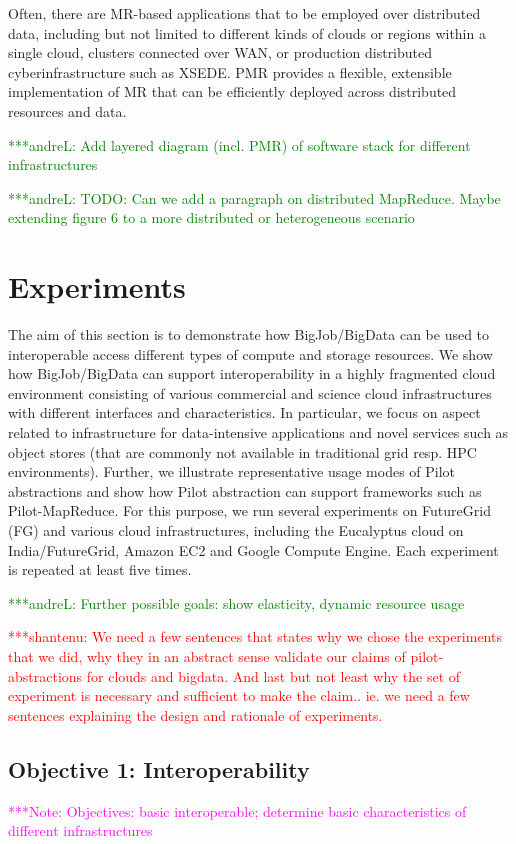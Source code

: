 \documentclass[times]{cpeauth}
\newcommand{\jhanote}[1]{ {\textcolor{red} { ***shantenu: #1 }}}
\newcommand{\alnote}[1]{ {\textcolor{green} { ***andreL: #1 }}}
\newcommand{\note}[1]{ {\textcolor{magenta} { ***Note: #1 }}}
\newcommand{\alnote}[1]{}
\newcommand{\jhanote}[1]{}
\newcommand{\note}[1]{}
\newcommand{\pilot}{Pilot\xspace}
\begin{document}
Often, there are MR-based applications that to be employed over distributed
data, including but not limited to different kinds of clouds or regions within
a single cloud, clusters connected over WAN, or production distributed
cyberinfrastructure such as XSEDE. PMR provides a flexible, extensible 
implementation of MR that can be efficiently deployed across distributed 
resources and data.



\alnote{Add layered diagram (incl. PMR) of software stack for different 
infrastructures}

\alnote{TODO: Can we add a paragraph on distributed MapReduce. Maybe extending 
figure 6 to a more distributed or heterogeneous scenario}


\section{Experiments}

The aim of this section is to demonstrate how BigJob/BigData can be used to
interoperable access different types of compute and storage resources. We show
how BigJob/BigData can support interoperability in a highly fragmented cloud
environment consisting of various commercial and science cloud infrastructures
with different interfaces and characteristics. In particular, we focus on
aspect related to infrastructure for data-intensive applications and novel
services such as object stores (that are commonly not available in traditional
grid resp. HPC environments). Further, we illustrate representative usage
modes of \pilot abstractions and show how \pilot abstraction can support
frameworks such as Pilot-MapReduce. For this purpose, we run several
experiments on FutureGrid (FG) and various cloud infrastructures, including
the Eucalyptus cloud on India/FutureGrid, Amazon EC2 and Google Compute
Engine. Each experiment is repeated at least five times.

\alnote{Further possible goals: show elasticity, dynamic resource usage}

\jhanote{We need a few sentences that states why we chose the
  experiments that we did, why they in an abstract sense validate our
  claims of pilot-abstractions for clouds and bigdata.  And last but
  not least why the set of experiment is necessary and sufficient to
  make the claim..  ie. we need a few sentences explaining the design
  and rationale of experiments.}
	
\subsection{Objective 1: Interoperability}
\label{sec:perf_interop}
\note{Objectives: basic interoperable; determine basic characteristics of 
different infrastructures}
\end{document}
